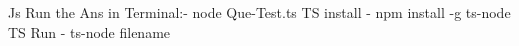 Js Run the Ans in Terminal:- node Que-Test.ts 
TS install - npm install -g ts-node 
TS Run - ts-node filename


